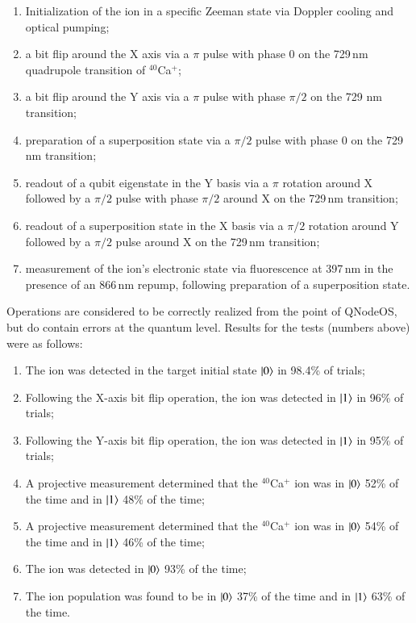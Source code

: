 \begin{enumerate}
\item Initialization of the ion in a specific Zeeman state via Doppler cooling and optical pumping;
\item a bit flip around the X axis via a $\pi$ pulse with phase 0 on the 729\,nm quadrupole transition of $^{40}$Ca$^+$;
\item a bit flip around the Y axis via a $\pi$ pulse with phase $\pi/2$ on the 729 nm transition;
\item preparation of a superposition state via a $\pi/2$ pulse with phase 0 on the 729\,nm transition;
\item readout of a qubit eigenstate in the Y basis via a $\pi$ rotation around X followed by a $\pi/2$ pulse with phase $\pi/2$ around X on the 729\,nm transition;
\item readout of a superposition state in the X basis via a $\pi/2$ rotation around Y followed by a $\pi/2$ pulse around X on the 729\,nm transition;
\item measurement of the ion’s electronic state via fluorescence at 397\,nm in the presence of an 866\,nm repump, following preparation of a superposition state.
\end{enumerate}

Operations are considered to be correctly realized from the point of \ac{QNodeOS}, but do contain errors at the quantum level. Results for the tests (numbers above) were as follows:
%
\begin{enumerate}
\item The ion was detected in the target initial state $\ket{0}$ in 98.4\% of trials;
\item Following the X-axis bit flip operation, the ion was detected in $\ket{1}$ in 96\% of trials;
\item Following the Y-axis bit flip operation, the ion was detected in $\ket{1}$ in 95\% of trials;
\item A projective measurement determined that the $^{40}$Ca$^{+}$ ion was in $\ket{0}$ 52\% of the time and in $\ket{1}$ 48\% of the time;
\item A projective measurement determined that the $^{40}$Ca$^{+}$ ion was in $\ket{0}$ 54\% of the time and in $\ket{1}$ 46\% of the time;
\item The ion was detected in $\ket{0}$ 93\% of the time;
\item The ion population was found to be in $\ket{0}$ 37\% of the time and in $\ket{1}$ 63\% of the time.
\end{enumerate}

